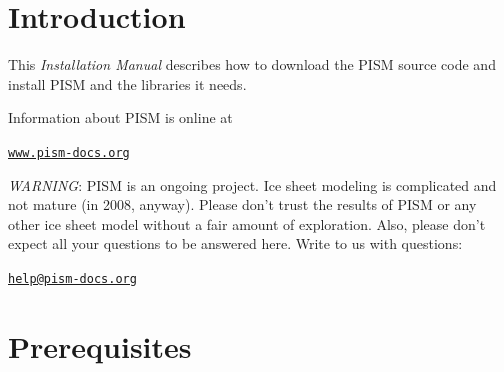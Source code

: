 \documentclass[11pt,final]{amsart}
\renewcommand{\t}[1]{\texttt{#1}}
\begin{document}
\newpage
\setcounter{tocdepth}{2}
\tableofcontents


\newpage
\section{Introduction}\label{sect:intro}

This \emph{Installation Manual} describes how to download the PISM source code and install PISM and the libraries it needs.

Information about PISM is online at
\begin{center}
  \href{http://www.pism-docs.org}{\t{www.pism-docs.org}}
\end{center}

\begin{center}
\large
 \emph{WARNING}:  PISM is an ongoing project.  Ice sheet modeling is complicated and not mature (in 2008, anyway).  Please don't trust the results of PISM or any other ice sheet model without a fair amount of exploration.  Also, please don't expect all your questions to be answered here.  Write to us with questions: \large
\bigskip

\href{mailto:help@pism-docs.org}{\texttt{help@pism-docs.org}}
\normalsize
\end{center}

\clearpage
\section{Prerequisites}
\label{sec:prerequisites}
\end{document}
